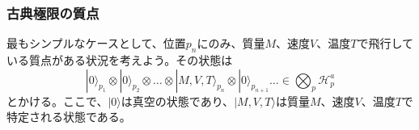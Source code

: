 \subsubsection{古典極限の質点}
最もシンプルなケースとして、位置$p_n$にのみ、質量$M$、速度$V$、温度$T$で飛行している質点がある状況を考えよう。その状態は
\begin{equation}
    |0\rangle_{p_1} \otimes |0\rangle_{p_2} \otimes \ldots \otimes |M,V,T\rangle_{p_n} \otimes |0\rangle_{p_{n+1}} \ldots \in \bigotimes_p \mathcal{H}_p^a
\end{equation}
とかける。ここで、$|0\rangle$は真空の状態であり、$|M,V,T\rangle$は質量$M$、速度$V$、温度$T$で特定される状態である。